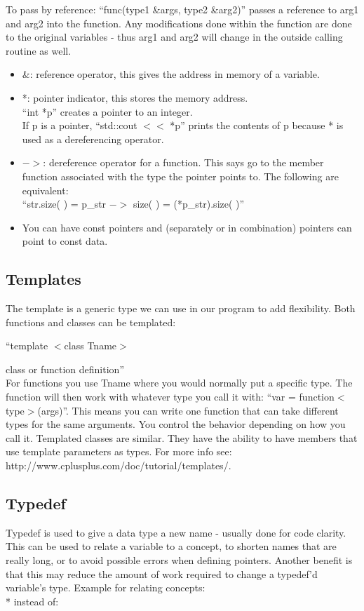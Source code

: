 \documentclass[12pt,twoside]{article}
\begin{document}
To pass by reference: ``func(type1 \&args, type2 \&arg2)'' passes a reference to arg1 and arg2 into the function. Any modifications done within the function are done to the original variables - thus arg1 and arg2 will change in the outside calling routine as well. 

\begin{itemize}
   \item \&: reference operator, this gives the address in memory of a variable. 
   \item *: pointer indicator, this stores the memory address. \\
``int *p'' creates a pointer to an integer. \\
If p is a pointer, ``std::cout $<<$ *p'' prints the contents of p because * is used as a dereferencing operator.
   \item $->$: dereference operator for a function. This says go to the member function associated with the type the pointer points to. The following are equivalent: \\
   ``str.size( ) = p\_str $->$ size( ) = (*p\_str).size( )''
   \item You can have const pointers and (separately or in combination) pointers can point to const data.
\end{itemize}

\subsection{Templates}
    The template is a generic type we can use in our program to add flexibility. Both functions and classes can be templated: 
    
``template $<$class Tname$>$

   class or function definition''\\
For functions you use Tname where you would normally put a specific type. The function will then work with whatever type you call it with:  ``var = function$<$type$>$(args)''. This means you can write one function that can take different types for the same arguments. You control the behavior depending on how you call it. Templated classes are similar. They have the ability to have members that use template parameters as types. For more info see: \\
    http://www.cplusplus.com/doc/tutorial/templates/.

\subsection{Typedef}
     Typedef is used to give a data type a new name - usually done for code clarity. This can be used to relate a variable to a concept, to shorten names that are really long, or to avoid possible errors when defining pointers. Another benefit is that this may reduce the amount of work required to change a typedef'd variable's type. Example for relating concepts:\\
* instead of:
\end{document}
